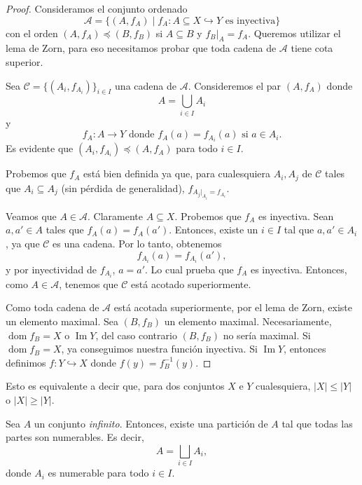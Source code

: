 \begin{proof}
	Consideramos el conjunto ordenado
	$$
		\mathcal{A} = \{ (A, f_{A}) \mid f_{A}: A \subseteq X \hookrightarrow Y  \text{ es inyectiva}\}
	$$
	con el orden $(A, f_{A}) \preceq (B, f_{B})$ si $A \subseteq B$ y $f_{B}|_{A} = f_{A}$. Queremos utilizar el lema de Zorn, para eso necesitamos probar que toda cadena de $\mathcal{A}$ tiene cota superior.

	Sea $\mathcal{C} = \{ (A_{i}, f_{A_{i}})\}_{i \in I}$ una cadena de $\mathcal{A}$. Consideremos el par $(A, f_{A})$ donde
	$$
		A = \bigcup_{i \in I} A_{i}
	$$
	y
	$$
		f_{A} : A \to Y \text{ donde } f_{A}(a) = f_{A_{i}}(a) \text{ si } a \in A_{i}.
	$$
	Es evidente que $(A_{i}, f_{A_{i}}) \preceq (A, f_{A})$ para todo $i \in I$.

	Probemos que $f_{A}$ está bien definida ya que, para cualesquiera $A_{i}, A_{j}$ de $\mathcal{C}$ tales que $A_{i} \subseteq A_{j}$ (sin pérdida de generalidad), $f_{A_{j}|_{A_{i}} = f_{A_{i}}}$.

	Veamos que $A \in \mathcal{A}$. Claramente $A \subseteq X$. Probemos que $f_{A}$ es inyectiva. Sean $a, a' \in A$ tales que $f_{A}(a) = f_{A}(a')$. Entonces, existe un $i \in I$ tal que $a, a' \in A_{i}$, ya que $\mathcal{C}$ es una cadena. Por lo tanto, obtenemos
	$$
		f_{A_{i}}(a) =f_{A_{i}}(a'),
	$$
	y por inyectividad de $f_{A_{i}}$, $a = a'$. Lo cual prueba que $f_{A}$ es inyectiva. Entonces, como $A \in \mathcal{A}$, tenemos que $\mathcal{C}$ está acotado superiormente.

	Como toda cadena de $\mathcal{A}$ está acotada superiormente, por el lema de Zorn, existe un elemento maximal. Sea $(B, f_{B})$ un elemento maximal. Necesariamente, $\operatorname{dom} f_{B} = X$ o
	$\operatorname{Im} Y$, del caso contrario $(B, f_{B})$ no sería maximal. Si $\operatorname{dom} f_{B} = X$, ya conseguimos nuestra función inyectiva. Si $\operatorname{Im} Y$, entonces definimos $f: Y \hookrightarrow X$ donde $f(y) = f_{B}^{-1}(y)$.
\end{proof}

\begin{remark}
	Esto es equivalente a decir que, para dos conjuntos $X$ e $Y$ cualesquiera, $\lvert X \rvert \leq \lvert Y \rvert$ o $\lvert X \rvert \geq \lvert Y \rvert$.
\end{remark}

\begin{proposition}
	Sea $A$ un conjunto \textit{infinito}. Entonces, existe una partición de $A$ tal que todas las partes son numerables. Es decir,
	$$
		A = \bigsqcup_{i \in I} A_i,
	$$
	donde $A_i$ es numerable para todo $i \in I$.
\end{proposition}

